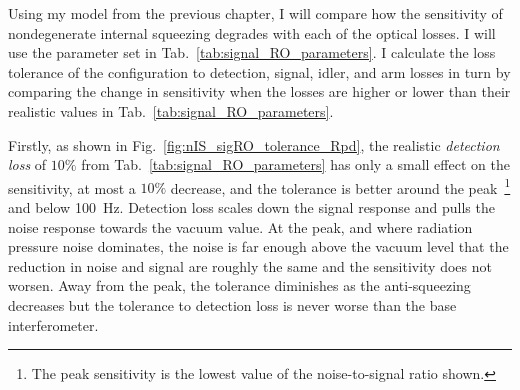 Using my model from the previous chapter, I will compare how the sensitivity of nondegenerate internal squeezing degrades with each of the optical losses. I will use the parameter set in Tab.~\ref{tab:signal_RO_parameters}.
I calculate the loss tolerance of the configuration to detection, signal, idler, and arm losses in turn by comparing the change in sensitivity when the losses are higher or lower than their realistic values in Tab.~\ref{tab:signal_RO_parameters}. %

Firstly, as shown in Fig.~\ref{fig:nIS_sigRO_tolerance_Rpd}, the realistic \emph{detection loss} of $10\%$ from Tab.~\ref{tab:signal_RO_parameters} has only a small effect on the sensitivity, at most a $10\%$ decrease, and the tolerance is better around the peak~\footnote{The peak sensitivity is the lowest value of the noise-to-signal ratio shown.} and below 100~Hz.
Detection loss scales down the signal response and pulls the noise response towards the vacuum value. At the peak, and where radiation pressure noise dominates, the noise is far enough above the vacuum level that the reduction in noise and signal are roughly the same and the sensitivity does not worsen. Away from the peak, the tolerance diminishes as the anti-squeezing decreases but the tolerance to detection loss is never worse than the base interferometer. %

